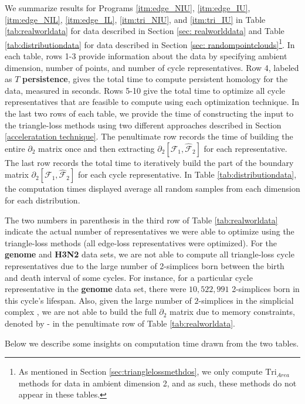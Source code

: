 \documentclass[utf8]{formatting_stuff/frontiersFPHY}
\newcommand{\tab}{Table }
\newcommand{\se}{Section }
\newcommand{\area}{_{Area}}
\newcommand{\Tri}{\mathrm{Tri}}
\theoremstyle{plain}
\theoremstyle{definition}
\begin{document}
We summarize results for Programs \ref{itm:edge_NIU}, \ref{itm:edge_IU}, \ref{itm:edge_NIL},
\ref{itm:edge_IL},
\ref{itm:tri_NIU}, and 
\ref{itm:tri_IU} in \tab \ref{tab:realworldata} for data described in \se \ref{sec: realworlddata} and \tab \ref{tab:distributiondata} for data described in \se \ref{sec: randompointclouds}\footnote{As mentioned in \se \ref{sec:trianglelossmethdos}, we only compute $\Tri\area$ methods for data in ambient dimension 2, and as such, these methods do not appear in these tables.}. In each table, rows 1-3 provide information about the data by specifying ambient dimension, number of points, and number of cycle representatives. Row 4, labeled as $T$ \textbf{persistence}, gives the total time to compute persistent homology for the data, measured in seconds. Rows 5-10 give the total time to optimize all cycle representatives that are feasible to compute using each optimization technique. In the last two rows of each table, we provide the time of constructing the input to the triangle-loss methods using two different approaches described in \se \ref{acceleratation technique}. The penultimate row records the time of building the entire $\partial_{2}$ matrix once and then extracting $\partial_2[\mathcal{F}_1, \hat {\mathcal{F}}_{2}]$ for each representative. The last row records the total time to iteratively build the part of the boundary matrix $\partial_{2}[ \mathcal{F}_1 , \hat {\mathcal{F}}_{2} ]$ for each cycle representative. In \tab \ref{tab:distributiondata}, the computation times displayed average all random samples from each dimension for each distribution. 

The two numbers in parenthesis in the third row of \tab \ref{tab:realworldata} indicate the actual number of representatives we were able to optimize using the triangle-loss methods (all edge-loss representatives were optimized). For the \textbf{genome} and \textbf{H3N2} data sets, we are not able to compute all triangle-loss cycle representatives due to the large number of 2-simplices born between the birth and death interval of some cycles. For instance, for a particular cycle representative in the \textbf{genome} data set, there were $10,522,991$ 2-simplices born in this cycle's lifespan. 
Also, given the large number of $2$-simplices in the simplicial complex 
, we are not able to build the full $\partial_2$ matrix due to memory constraints, denoted by - in the penultimate row of \tab \ref{tab:realworldata}. 

Below we describe some insights on computation time drawn from the two tables. 
\end{document}
